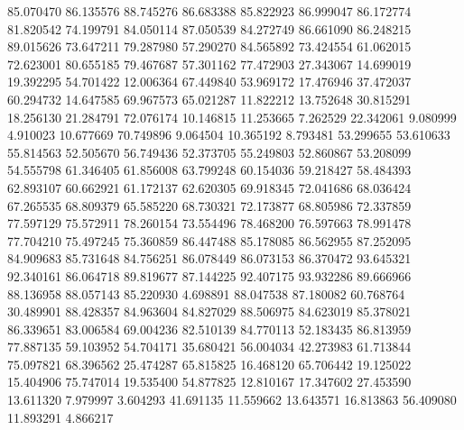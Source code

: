85.070470
86.135576
88.745276
86.683388
85.822923
86.999047
86.172774
81.820542
74.199791
84.050114
87.050539
84.272749
86.661090
86.248215
89.015626
73.647211
79.287980
57.290270
84.565892
73.424554
61.062015
72.623001
80.655185
79.467687
57.301162
77.472903
27.343067
14.699019
19.392295
54.701422
12.006364
67.449840
53.969172
17.476946
37.472037
60.294732
14.647585
69.967573
65.021287
11.822212
13.752648
30.815291
18.256130
21.284791
72.076174
10.146815
11.253665
7.262529
22.342061
9.080999
4.910023
10.677669
70.749896
9.064504
10.365192
8.793481
53.299655
53.610633
55.814563
52.505670
56.749436
52.373705
55.249803
52.860867
53.208099
54.555798
61.346405
61.856008
63.799248
60.154036
59.218427
58.484393
62.893107
60.662921
61.172137
62.620305
69.918345
72.041686
68.036424
67.265535
68.809379
65.585220
68.730321
72.173877
68.805986
72.337859
77.597129
75.572911
78.260154
73.554496
78.468200
76.597663
78.991478
77.704210
75.497245
75.360859
86.447488
85.178085
86.562955
87.252095
84.909683
85.731648
84.756251
86.078449
86.073153
86.370472
93.645321
92.340161
86.064718
89.819677
87.144225
92.407175
93.932286
89.666966
88.136958
88.057143
85.220930
4.698891
88.047538
87.180082
60.768764
30.489901
88.428357
84.963604
84.827029
88.506975
84.623019
85.378021
86.339651
83.006584
69.004236
82.510139
84.770113
52.183435
86.813959
77.887135
59.103952
54.704171
35.680421
56.004034
42.273983
61.713844
75.097821
68.396562
25.474287
65.815825
16.468120
65.706442
19.125022
15.404906
75.747014
19.535400
54.877825
12.810167
17.347602
27.453590
13.611320
7.979997
3.604293
41.691135
11.559662
13.643571
16.813863
56.409080
11.893291
4.866217
